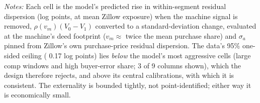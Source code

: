 \begin{table}[!htbp]\centering
\caption{Calibrated price-discovery effect vs.\ the data's ceiling}
\label{tab:calibration}
\begin{minipage}{0.92\linewidth}\footnotesize\vspace{2pt}
\emph{Notes:} Each cell is the model's predicted rise in within-segment
residual dispersion (log points, at mean Zillow exposure) when the machine
signal is removed, $\rho(v_m)(V_0-V_1)$ converted to a standard-deviation
change, evaluated at the machine's deed footprint ($v_m \approx$ twice the
mean purchase share) and $\sigma_a$ pinned from Zillow's own purchase-price
residual dispersion. The data's 95\% one-sided ceiling (
0.17 log points) lies \emph{below} the model's
most aggressive cells (large comp windows and high buyer-error share; 3 of 9 columns shown), which the design therefore rejects, and above its
central calibrations, with which it is consistent. The externality is
bounded tightly, not point-identified; either way it is economically small.
\end{minipage}
\end{table}
